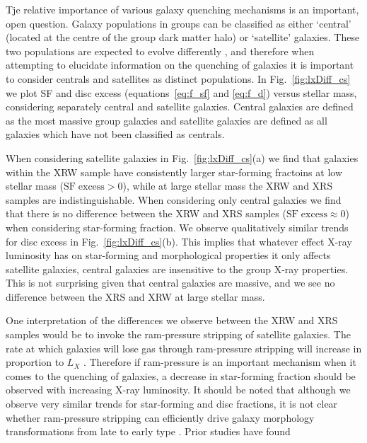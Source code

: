 Tje relative importance of various galaxy quenching mechanisms is an
important, open question.  Galaxy populations in groups can be
classified as either `central' (located at the centre of the group
dark matter halo) or `satellite' galaxies.  These two populations are
expected to evolve differently \citep[e.g.][]{vandenbosch2008b}, and
therefore when attempting to elucidate information on the quenching of
galaxies it is important to consider centrals and satellites as
distinct populations.  In Fig.~\ref{fig:lxDiff_cs} we plot SF and disc
excess (equations~\ref{eq:f_sf} and \ref{eq:f_d}) versus stellar mass,
considering separately central and satellite galaxies.  Central
galaxies are defined as the most massive group galaxies and satellite
galaxies are defined as all galaxies which have not been classified as
centrals.
\par
When considering satellite galaxies in Fig.~\ref{fig:lxDiff_cs}(a) we
find that galaxies within the XRW sample have consistently larger
star-forming fractoins at low stellar mass
($\mathrm{SF}\;\mathrm{excess} > 0$), while at large stellar mass the
XRW and XRS samples are indistinguishable.  When considering only
central galaxies we find that there is no difference between the XRW
and XRS samples ($\mathrm{SF}\;\mathrm{excess} \approx 0$) when
considering star-forming fraction.  We observe qualitatively similar
trends for disc excess in Fig.~\ref{fig:lxDiff_cs}(b).  This implies
that whatever effect X-ray luminosity has on star-forming and
morphological properties it only affects satellite galaxies, central
galaxies are insensitive to the group X-ray properties.  This is not
surprising given that central galaxies are massive, and we see no
difference between the XRS and XRW at large stellar mass.
\par
One interpretation of the differences we observe between the XRW and
XRS samples would be to invoke the ram-pressure stripping of satellite
galaxies.  The rate at which galaxies will lose gas through
ram-pressure stripping will increase in proportion to $L_X$
\citep{fairley2002}.  Therefore if ram-pressure is an important
mechanism when it comes to the quenching of galaxies, a decrease in
star-forming fraction should be observed with increasing X-ray
luminosity.  It should be noted that although we observe very similar
trends for star-forming and disc fractions, it is not clear whether
ram-pressure stripping can efficiently drive galaxy morphology
transformations from late to early type \citep{christlein2004}.  Prior
studies \citep[e.g.][]{gavazzi2003, kenney2004, muzzin2014} have found
